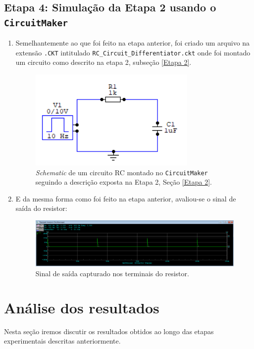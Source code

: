 \documentclass[letterpaper, 12pt]{article}
\begin{document}
\subsection{Etapa 4: Simulação da Etapa 2 usando o \texttt{CircuitMaker}}
\begin{enumerate}

    \item Semelhantemente ao que foi feito na etapa anterior, foi criado um arquivo na extensão \texttt{.CKT} intitulado \texttt{RC\_Circuit\_Differentiator.ckt} onde foi montado um circuito como descrito na etapa 2, subseção \ref{Etapa 2}.
    \begin{figure}[h]
        \centering
        \includegraphics[width=0.5\linewidth]{figures/RC_Circuit_Diff.png}
        \caption{{\it Schematic} de um circuito RC montado no \texttt{CircuitMaker} seguindo a descrição exposta na Etapa 2, Seção \ref{Etapa 2}.}
        \label{RC_Circuit_Integrator}
    \end{figure}
    
    \item E da mesma forma como foi feito na etapa anterior, avaliou-se o sinal de saída do resistor:
    \begin{figure}[h]
        \centering
        \includegraphics[width=0.5\linewidth]{figures/RC_Circuit_Resistor.png}
        \caption{Sinal de saída capturado nos terminais do resistor.}
        \label{RC_Circuit_Resistor}
    \end{figure}
    
\end{enumerate}


\section{Análise dos resultados}\label{Sec 4}
Nesta seção iremos discutir os resultados obtidos ao longo das etapas experimentais descritas anteriormente. 
\end{document}
